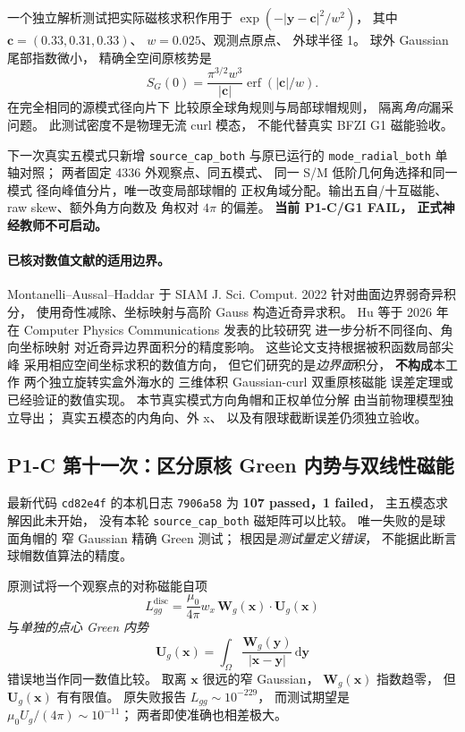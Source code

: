一个独立解析测试把实际磁核求积作用于
$\exp(-|\bm y-\bm c|^2/w^2)$，
其中 $\bm c=(0.33,0.31,0.33)$、
$w=0.025$、观测点原点、
外球半径 1。
球外 Gaussian 尾部指数微小，
精确全空间原核势是
\[
 S_G(0)=\frac{\pi^{3/2}w^3}{|\bm c|}
 \operatorname{erf}(|\bm c|/w).
\]
在完全相同的源模式径向片下
比较原全球角规则与局部球帽规则，
隔离\emph{角向}漏采问题。
此测试密度不是物理无流 curl 模态，
不能代替真实 BFZI G1 磁能验收。

下一次真实五模式只新增
\texttt{source\_cap\_both} 与原已运行的
\texttt{mode\_radial\_both} 单轴对照；
两者固定 4336 外观察点、同五模式、
同一 S/M 低阶几何角选择和同一模式
径向峰值分片，唯一改变局部球帽的
正权角域分配。输出五自/十互磁能、
raw skew、额外角方向数及
角权对 $4\pi$ 的偏差。
\textbf{当前 P1-C/G1 FAIL，
正式神经教师不可启动。}


\paragraph{已核对数值文献的适用边界。}
Montanelli--Aussal--Haddar 于
SIAM J. Sci. Comput. 2022
\cite{montanelli2022weakly}
针对曲面边界弱奇异积分，
使用奇性减除、坐标映射与高阶 Gauss
构造近奇异求积。
Hu 等于 2026 年在
Computer Physics Communications
发表的比较研究
\cite{hu2026transformation}
进一步分析不同径向、角向坐标映射
对近奇异边界面积分的精度影响。
这些论文支持根据被积函数局部尖峰
采用相应空间坐标求积的数值方向，
但它们研究的是\emph{边界面}积分，
\textbf{不构成}本工作
两个独立旋转实盒外海水的
三维体积 Gaussian-curl 双重原核磁能
误差定理或已经验证的数值实现。
本节真实模式方向角帽和正权单位分解
由当前物理模型独立导出；
真实五模态的内角向、外 x、
以及有限球截断误差仍须独立验收。


\subsection{P1-C 第十一次：区分原核 Green 内势与双线性磁能}
\label{sec:p1-c-green-inner-potential-vs-energy}
最新代码 \texttt{cd82e4f} 的本机日志
\texttt{7906a58} 为
\textbf{107 passed，1 failed}，
主五模态求解因此未开始，
没有本轮 \texttt{source\_cap\_both}
磁矩阵可以比较。
唯一失败的是球面角帽的
窄 Gaussian 精确 Green 测试；
根因是\emph{测试量定义错误}，
不能据此断言球帽数值算法的精度。

原测试将一个观察点的对称磁能自项
\[
 L_{gg}^{\mathrm{disc}}=
 \frac{\mu_0}{4\pi}
 w_x\,\bm W_g(\bm x)\cdot\bm U_g(\bm x)
\]
与\emph{单独的点心 Green 内势}
\[
 \bm U_g(\bm x)=\int_\Omega
 \frac{\bm W_g(\bm y)}
      {|\bm x-\bm y|}\,\mathrm d\bm y
\]
错误地当作同一数值比较。
取离 $\bm x$ 很远的窄 Gaussian，
$\bm W_g(\bm x)$ 指数趋零，
但 $\bm U_g(\bm x)$ 有有限值。
原失败报告 $L_{gg}\sim10^{-229}$，
而测试期望是
$\mu_0 U_g/(4\pi)\sim10^{-11}$；
两者即使准确也相差极大。


